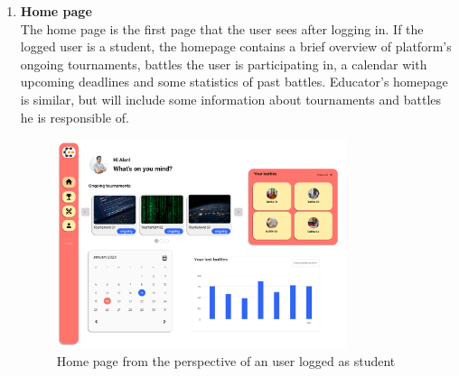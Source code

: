 \begin{enumerate}[label=\textbf{F\arabic*)}]
    \item \textbf{Home page}\\
    The home page is the first page that the user sees after logging in. If the logged user is a student, the homepage contains a brief overview of platform's ongoing tournaments, battles the user is participating in, a calendar with upcoming deadlines and some statistics of past battles. Educator's homepage is similar, but will include some information about tournaments and battles he is responsible of. \\
    \begin{figure}[H]
        \centering
        \includegraphics[width=0.8\textwidth]{Mockups/3_student_homepage.png}
        \caption{Home page from the perspective of an user logged as student}
    \end{figure}


\end{enumerate}
